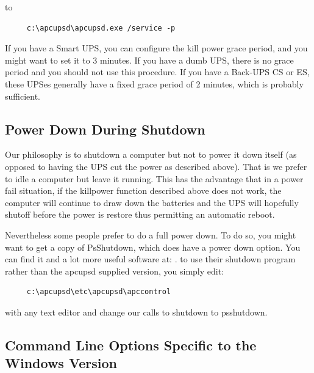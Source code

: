 {{{{{{{{{to 

\footnotesize
\begin{verbatim}
     c:\apcupsd\apcupsd.exe /service -p
\end{verbatim}
\normalsize

If you have a Smart UPS, you can configure the kill power grace period, and
you might want to set it to 3 minutes. If you have a dumb UPS, there is no
grace period and you should not use this procedure. If you have a Back-UPS CS
or ES, these UPSes generally have a fixed grace period of 2 minutes, which is
probably sufficient. 

\label{Power-Down-During-Shutdown}

\subsection*{Power Down During Shutdown}

\label{index-Windows_002c-Power-down-184}
\label{index-Power-down_002c-Windows-185}
Our philosophy is to shutdown a computer but not to power it down itself (as
opposed to having the UPS cut the power as described above). That is we prefer
to idle a computer but leave it running. This has the advantage that in a
power fail situation, if the killpower function described above does not work,
the computer will continue to draw down the batteries and the UPS will
hopefully shutoff before the power is restore thus permitting an automatic
reboot.  

Nevertheless some people prefer to do a full power down. To do so, you might
want to get a copy of PsShutdown, which does have a power down option. You can
find it and a lot more useful software at: 
. to use their shutdown program
rather than the apcupsd supplied version, you simply edit: 

\footnotesize
\begin{verbatim}
     c:\apcupsd\etc\apcupsd\apccontrol
\end{verbatim}
\normalsize

with any text editor and change our calls to shutdown to psshutdown. 

\label{Command-Line-Options-Specific-to-the-Windows-Version}

\subsection*{Command Line Options Specific to the Windows Version}

}}}}}}}}}
